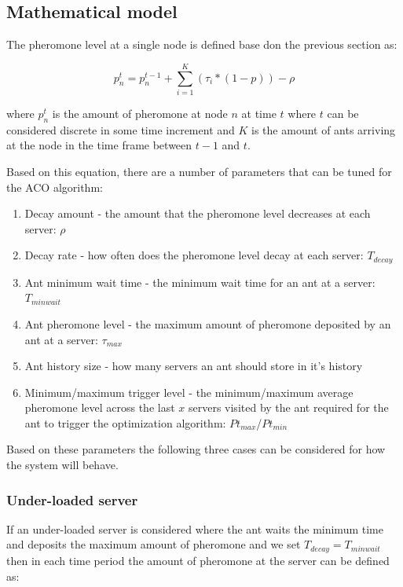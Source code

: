 \documentclass[conference]{IEEEtran}
\begin{document}
\subsection{Mathematical model}

The pheromone level at a single node is defined base don the previous section as:

\begin{equation}
p^{t}_{n} = p^{t-1}_{n} + \sum_{i=1}^{K}(\tau_{i} * (1 - p)) - \rho
\end{equation}

where $p^{t}_{n}$ is the amount of pheromone at node $n$ at time $t$ where $t$ can be considered discrete in some time increment and $K$ is the amount of ants arriving at the node in the time frame between $t-1$ and $t$.

Based on this equation, there are a number of parameters that can be tuned for the ACO algorithm:

\begin{enumerate}
	\item Decay amount - the amount that the pheromone level decreases at each server: $\rho$
	\item Decay rate - how often does the pheromone level decay at each server: $T_{decay}$
	\item Ant minimum wait time - the minimum wait time for an ant at a server: $T_{minwait}$
	\item Ant pheromone level - the maximum amount of pheromone deposited by an ant at a server: $\tau_{max}$
	\item Ant history size - how many servers an ant should store in it's history
	\item Minimum/maximum trigger level - the minimum/maximum average pheromone level across the last $x$ servers visited by the ant required for the ant to trigger the optimization algorithm: $Pt_{max}$/$Pt_{min}$
\end{enumerate}

Based on these parameters the following three cases can be considered for how the system will behave.

\subsubsection{Under-loaded server}

If an under-loaded server is considered where the ant waits the minimum time and deposits the maximum amount of pheromone and we set $T_{decay} = T_{minwait}$ then in each time period the amount of pheromone at the server can be defined as:
\end{document}
